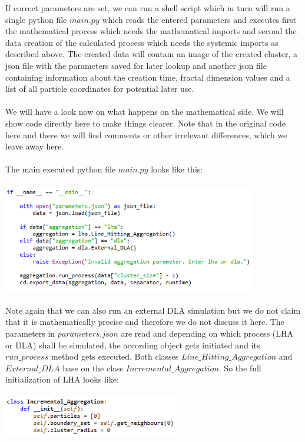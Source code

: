 \documentclass[12pt,a4paper]{scrartcl}
\newcommand{\1}{\mathbbm{1}}
\theoremstyle{definition}
\numberwithin{equation}{section}
\begin{document}
\noindent If correct parameters are set, we can run a shell script which in turn will run a single python file $\mathit{main.py}$ which reads the entered parameters and executes first the mathematical process which needs the mathematical imports and second the data creation of the calculated process which needs the systemic imports as described above. The created data will contain an image of the created cluster, a json file with the parameters saved for later lookup and another json file containing information about the creation time, fractal dimension values and a list of all particle coordinates for potential later use. \\
\\We will have a look now on what happens on the mathematical side. We will show code directly here to make things clearer. Note that in the original code here and there we will find comments or other irrelevant differences, which we leave away here. \\
\\The main executed python file $\mathit{main.py}$ looks like this:\\
\\
\includegraphics[height=4.66cm]{images/code-snippets/mainpy.png} \\
\\
Note again that we can also run an external DLA simulation but we do not claim that it is mathematically precise and therefore we do not discuss it here. The parameters in $\mathit{parameters.json}$ are read and depending on which process (LHA or DLA) shall be simulated, the according object gets initiated and its $\mathit{run\_process}$ method gets executed. Both classes $\mathit{Line\_Hitting\_Aggregation}$ and $\mathit{External\_DLA}$ base on the class $\mathit{Incremental\_Aggregation}$. So the full initialization of LHA looks like: \\
\\
\includegraphics[height=1.8cm]{images/code-snippets/initia.png} \\
\end{document}
